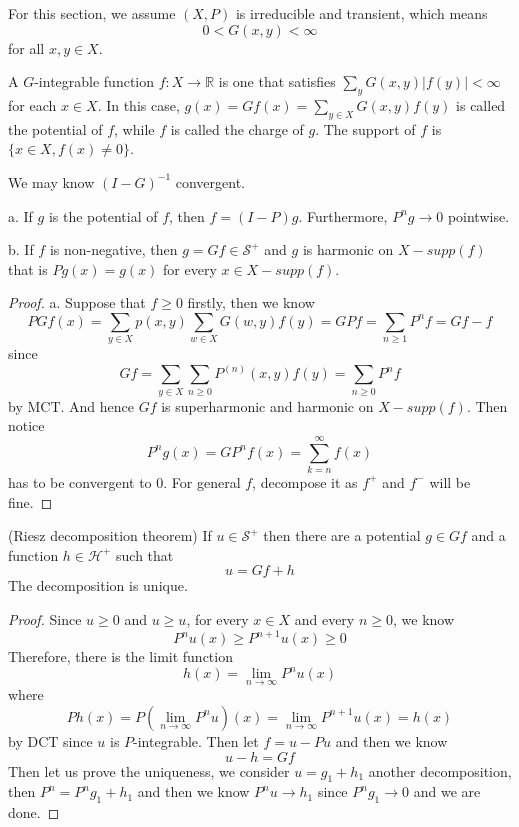 \documentclass[lang=en, color=blue, ]{elegantbook}
\newcommand{\R}{\mathbb{R}}
\newcommand{\Har}{\mathcal{H}}
\newcommand{\Sar}{\mathcal{S}}
\begin{document}
\begin{definition}
    For this section, we assume $(X,P)$ is irreducible and transient, which means
    \[0 < G(x,y) < \infty\]
    for all $x,y \in X$.\par
    A $G$-integrable function $f:X\to \R$ is one that satisfies $\sum\limits_{y} G(x,y)|f(y)| < \infty$ for each $x\in X$. In this case, $g(x) = Gf(x) = \sum\limits_{y\in X}G(x,y)f(y)$ is called the potential of $f$, while $f$ is called the charge of $g$. The support of $f$ is $\{x\in X, f(x) \neq 0\}$.\par
    We may know $(I-G)^{-1}$ convergent.
\end{definition}

\begin{lemma}
    a. If $g$ is the potential of $f$, then $f = (I-P)g$. Furthermore, $P^ng\to 0$ pointwise.\par
    b. If $f$ is non-negative, then $g = Gf \in \Sar^+$ and $g$ is harmonic on $X- supp(f)$ that is $Pg(x) = g(x)$ for every $x\in X-supp(f)$.
\end{lemma}
\begin{proof}
    a. Suppose that $f \geq 0$ firstly, then we know
    \[
    P Gf(x) = \sum\limits_{y\in X}p(x,y)\sum\limits_{w\in X} G(w,y)f(y) = G Pf = \sum\limits_{n\geq 1}P^n f = Gf - f
    \]
    since
    \[
    Gf = \sum\limits_{y\in X}\sum_{n\geq 0}P^{(n)}(x,y)f(y) = \sum\limits_{n\geq 0}P^nf
    \]
    by MCT. And hence $Gf$ is superharmonic and harmonic on $X-supp(f)$. Then notice
    \[
    P^ng(x) = GP^nf(x) = \sum\limits_{k=n}^{\infty}f(x)
    \]
    has to be convergent to $0$. For general $f$, decompose it as $f^+$ and $f^-$ will be fine.
\end{proof}

\begin{theorem}
    (Riesz decomposition theorem) If $u\in \Sar^+$ then there are a potential $g\in Gf$ and a function $h\in\Har^+$ such that
    \[u = Gf + h\]
    The decomposition is unique.
\end{theorem}
\begin{proof}
    Since $u\geq 0$ and $u\geq u$, for every $x\in X$ and every $n\geq 0$, we know
    \[
    P^nu(x) \geq P^{n+1}u(x) \geq 0
    \]
    Therefore, there is the limit function
    \[
    h(x) = \lim_{n\to\infty} P^nu(x)
    \]
    where
    \[
    Ph(x) = P(\lim_{n\to\infty} P^n u)(x) = \lim_{n\to\infty}P^{n+1}u(x) = h(x)
    \]
    by DCT since $u$ is $P$-integrable. Then let $f = u - Pu$ and then we know
    \[
    u-h = Gf
    \]
    Then let us prove the uniqueness, we consider $u = g_1+h_1$ another decomposition, then $P^n = P^ng_1 + h_1$ and then we know $P^n u \to h_1$ since $P^ng_1 \to 0$ and we are done.
\end{proof}
\end{document}
